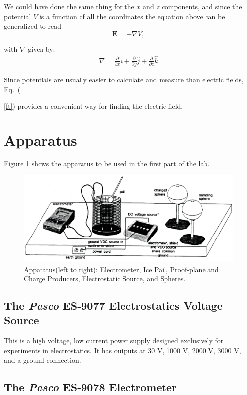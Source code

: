 {We could have done the same thing for the $x$ and $z$ components,
and since the potential $V$ is a function of all the coordinates
the equation above can be generalized to read
\begin{equation}
{\mathbf{E}}=-\nabla V,
 \label{ft}
\end{equation}

with $\nabla$ given by:
\begin{eqnarray*}
\nabla=\frac{\partial}{\partial x}\hat{i}+\frac{\partial}{\partial
y}\hat{j}+\frac{\partial}{\partial z}\hat{k}
\end{eqnarray*}

Since potentials are usually easier to calculate and measure than
electric fields, Eq.~({\ref{ft}) provides a convenient way for
finding the electric field.



\section{Apparatus}
Figure \ref{es5} shows the apparatus to be used in the first part
of the lab.

\begin{figure}[!htb]
\centering
\epsfxsize=16cm \includegraphics[scale=0.6]{1_electrostatics/Electrostatics.eps}
\caption{Apparatus(left to right): Electrometer, Ice
Pail, Proof-plane and Charge Producers, Electrostatic Source, and
Spheres.}
 \label{es5}
\end{figure}

\subsection{The {\it Pasco} ES-9077 Electrostatics Voltage Source}
This is a high voltage, low current power supply designed
exclusively for experiments in electrostatics.  It has outputs at
30 V, 1000 V, 2000 V, 3000 V, and a ground connection.


\subsection{The {\it Pasco} ES-9078 Electrometer}

}}
